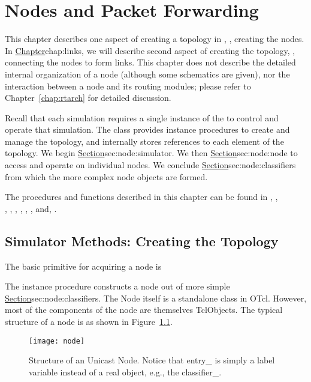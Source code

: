 \chapter{Nodes and Packet Forwarding}
\label{chap:nodes}

This chapter describes one aspect of creating a topology in \ns,
\ie, creating the nodes.
In 
\href{the next chapter}{Chapter}{chap:links},
we will describe second aspect of creating the topology,
\ie, connecting the nodes to form links.
This chapter does not describe the detailed internal organization of
a node (although some schematics are given), nor the interaction
between a node and its routing modules; please refer to
Chapter~\ref{chap:rtarch} for detailed discussion.

Recall that each simulation requires a single instance of the
 to control and operate
that simulation. 
The class provides instance procedures to create and manage the topology,
and internally stores references to each element of the topology.
We begin 
\href{by describing the procedures in the class Simulator}{%
        Section}{sec:node:simulator}.
We then
\href{describe the instance procedures in the class Node}{%
        Section}{sec:node:node}
to access and operate on individual nodes.
We conclude
\href{with detailed descriptions of the Classifier}{%
        Section}{sec:node:classifiers}
from which the more complex node objects are formed.

The procedures and functions described in this chapter can be found in
, , \\
, , 
, ,
, , 
and, .

\section{Simulator Methods: Creating the Topology}
\label{sec:node:simulator}

The basic primitive for acquiring a node is
The instance procedure  constructs
a node out of more simple
\href{classifier objects}{Section}{sec:node:classifiers}.
The Node itself is a standalone class in OTcl.
However, most of the components of the node are themselves TclObjects.
The typical structure of a node is as shown in Figure~\ref{fig:node:unicast}.
\begin{figure}[tb]
  \centerline{\texttt{[image: node]}}
  \caption{Structure of an Unicast Node. Notice that entry\_ is simply a
    label variable instead of a real object, e.g., the classifier\_.}
  \label{fig:node:unicast}
\end{figure}

